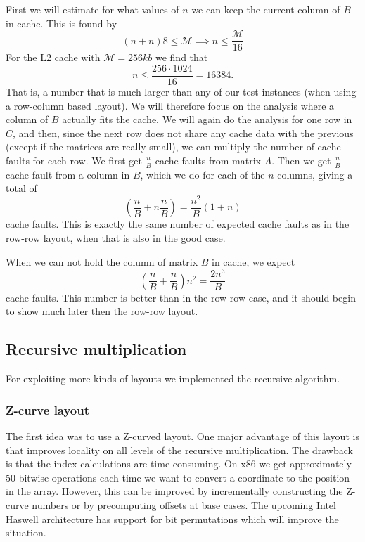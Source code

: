 First we will estimate for what values of $n$ we can keep the current
column of $B$ in cache. This is found by
\[
(n + n)8 \leq \mathcal{M} \implies n \leq \frac{\mathcal{M}}{16}
\]
For the L2 cache with $\mathcal{M} = 256kb$ we find that
\[
n \leq \frac{256 \cdot 1024}{16} = 16384.
\]
That is, a number that is much larger than any of our test instances
(when using a row-column based layout). We will therefore focus on the
analysis where a column of $B$ actually fits the cache. We will again
do the analysis for one row in $C$, and then, since the next row does
not share any cache data with the previous (except if the matrices are
really small), we can multiply the number of cache faults for each
row. We first get $\frac{n}{B}$ cache faults from matrix $A$. Then we
get $\frac{n}{B}$ cache fault from a column in $B$, which we do for
each of the $n$ columns, giving a total of
\[
\left( \frac{n}{B} + n \frac{n}{B} \right) = \frac{n^2}{B}\left(1 + n \right)
\]
cache faults. This is exactly the same number of expected cache faults
as in the row-row layout, when that is also in the good case.

When we can not hold the column of matrix $B$ in cache, we expect
\[
\left( \frac{n}{B} + \frac{n}{B} \right) n^2 = \frac{2n^3}{B}
\]
cache faults. This number is better than in the row-row case, and it
should begin to show much later then the row-row layout.

\subsection{Recursive multiplication}

For exploiting more kinds of layouts we implemented the recursive algorithm.

\subsubsection{Z-curve layout}

The first idea was to use a Z-curved layout. One major advantage of this layout is that improves locality on all levels of the recursive multiplication. The drawback is that the index calculations are time consuming. On x86 we get approximately 50 bitwise operations each time we want to convert a coordinate to the position in the array. However, this can be improved by incrementally constructing the Z-curve numbers or by precomputing offsets at base cases. The upcoming Intel Haswell architecture has support for bit permutations which will improve the situation.

